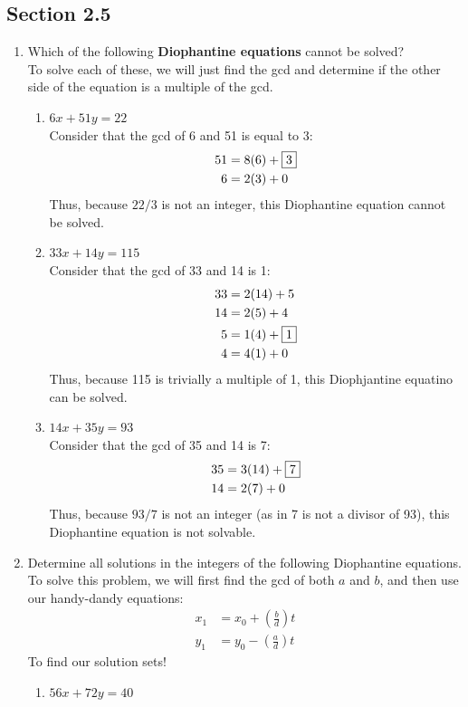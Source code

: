 \documentclass[10pt,oneside]{book}
\newcommand{\gspc}{\vspace{0.13cm}} %
\newcommand{\gline}{\gspc\\} %
\begin{document}
\subsection*{Section 2.5}
\begin{enumerate}
	\item Which of the following \textbf{Diophantine equations} cannot be solved?\gline
	To solve each of these, we will just find the gcd and determine if the other side of the equation is a multiple of the gcd. 
	\begin{enumerate}
		\item $6x +51y = 22$\gline
		Consider that the gcd of 6 and 51 is equal to 3:
		\begin{align*}
			51 &= 8(6) + \fbox{3}\\
			6 &= 2(3) + 0
		\end{align*}
		Thus, because $22/3$ is not an integer, this Diophantine equation cannot be solved.
		\item $33x + 14y = 115$\gline
		Consider that the gcd of 33 and 14 is 1:
		\begin{align*}
			33 &= 2(14) + 5 \\
			14 &= 2(5) + 4\\
			5 &= 1(4) + \fbox{1}\\
			4 &= 4(1) + 0
		\end{align*}
		Thus, because 115 is trivially a multiple of 1, this Diophjantine equatino can be solved.
		\item $14x + 35y = 93$\gline
		Consider that the gcd of 35 and 14 is 7:
		\begin{align*}
			35 &= 3(14) + \fbox{7}\\
			14 &= 2(7) + 0 
		\end{align*}
		Thus, because $93/7$ is not an integer (as in 7 is not a divisor of 93), this Diophantine equation is not solvable.
	\end{enumerate}
	\item Determine all solutions in the integers of the following Diophantine equations.\gline
	To solve this problem, we will first find the gcd of both $a$ and $b$, and then use our handy-dandy equations:
	\begin{align*}
		x_1 &= x_0 + \left(\frac{b}d\right)t\\
		y_1&= y_0 - \left(\frac{a}d\right)t
	\end{align*}
	To find our solution sets!
	\pagebreak
	\begin{enumerate}
		\item $56x + 72y=40$\gline

\end{enumerate}
\end{enumerate}
\end{document}
